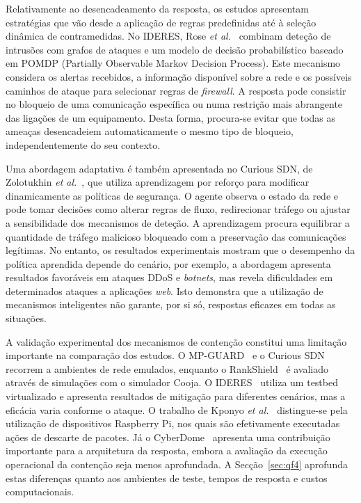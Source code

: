 \documentclass[conference,a4paper]{IEEEtran}
\begin{document}
Relativamente ao desencadeamento da resposta, os estudos apresentam estratégias que vão desde a aplicação de regras predefinidas até à seleção dinâmica de contramedidas. No IDERES, Rose \textit{et al.}~\cite{rose2022ideres} combinam deteção de intrusões com grafos de ataques e um modelo de decisão probabilístico baseado em POMDP (Partially Observable Markov Decision Process). Este mecanismo considera os alertas recebidos, a informação disponível sobre a rede e os possíveis caminhos de ataque para selecionar regras de \textit{firewall}. A resposta pode consistir no bloqueio de uma comunicação específica ou numa restrição mais abrangente das ligações de um equipamento. Desta forma, procura-se evitar que todas as ameaças desencadeiem automaticamente o mesmo tipo de bloqueio, independentemente do seu contexto.

Uma abordagem adaptativa é também apresentada no Curious SDN, de Zolotukhin \textit{et al.}~\cite{zolotukhin2021curious}, que utiliza aprendizagem por reforço para modificar dinamicamente as políticas de segurança. O agente observa o estado da rede e pode tomar decisões como alterar regras de fluxo, redirecionar tráfego ou ajustar a sensibilidade dos mecanismos de deteção. A aprendizagem procura equilibrar a quantidade de tráfego malicioso bloqueado com a preservação das comunicações legítimas. No entanto, os resultados experimentais mostram que o desempenho da política aprendida depende do cenário, por exemplo, a abordagem apresenta resultados favoráveis em ataques DDoS e \textit{botnets}, mas revela dificuldades em determinados ataques a aplicações \textit{web}. Isto demonstra que a utilização de mecanismos inteligentes não garante, por si só, respostas eficazes em todas as situações.

A validação experimental dos mecanismos de contenção constitui uma limitação importante na comparação dos estudos. O MP-GUARD~\cite{elsayed2024mpguard} e o Curious SDN~\cite{zolotukhin2021curious} recorrem a ambientes de rede emulados, enquanto o RankShield~\cite{hunde2026rankshield} é avaliado através de simulações com o simulador Cooja. O IDERES~\cite{rose2022ideres} utiliza um testbed virtualizado e apresenta resultados de mitigação para diferentes cenários, mas a eficácia varia conforme o ataque. O trabalho de Kponyo \textit{et al.}~\cite{kponyo2020lightweight} distingue-se pela utilização de dispositivos Raspberry Pi, nos quais são efetivamente executadas ações de descarte de pacotes. Já o CyberDome~\cite{karibandi2025cyberdome} apresenta uma contribuição importante para a arquitetura da resposta, embora a avaliação da execução operacional da contenção seja menos aprofundada. A Secção~\ref{sec:qf4} aprofunda estas diferenças quanto aos ambientes de teste, tempos de resposta e custos computacionais.
\end{document}
